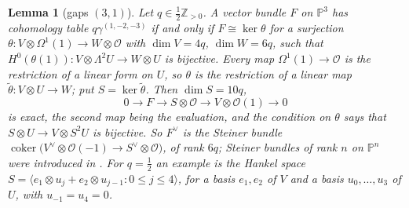 \documentclass[11pt]{amsart}
\newtheorem{lemma}[theorem]{Lemma}
\theoremstyle{definition}
\theoremstyle{remark}
\newcommand{\PP}{\mathbb{P}}
\newcommand{\ZZ}{\mathbb{Z}}
\newcommand{\OO}{\mathcal{O}}
\DeclareMathOperator{\coker}{coker}
\begin{document}
\begin{lemma}[gaps $(3,1)$]\label{lem:beil31}
Let $q\in\frac12\ZZ_{>0}$. A vector bundle $F$ on $\PP^3$ has cohomology table $q\gamma^{(1,-2,-3)}$ if and only if $F\cong\ker\theta$ for a surjection $\theta\colon V\otimes\Omega^1(1)\to W\otimes\OO$ with $\dim V=4q$, $\dim W=6q$, such that $H^0(\theta(1))\colon V\otimes\Lambda^2U\to W\otimes U$ is bijective. Every map $\Omega^1(1)\to\OO$ is the restriction of a linear form on $U$, so $\theta$ is the restriction of a linear map $\tilde\theta\colon V\otimes U\to W$; put $S=\ker\tilde\theta$. Then $\dim S=10q$,
\[
0\longrightarrow F\longrightarrow S\otimes\OO\longrightarrow V\otimes\OO(1)\longrightarrow0
\]
is exact, the second map being the evaluation, and the condition on $\theta$ says that $S\otimes U\to V\otimes S^2U$ is bijective. So $F^\vee$ is the Steiner bundle $\coker\big(V^\vee\otimes\OO(-1)\to S^\vee\otimes\OO\big)$, of rank $6q$; Steiner bundles of rank $n$ on $\PP^n$ were introduced in \cite{DK93}. For $q=\frac12$ an example is the Hankel space $S=\langle e_1\otimes u_{j}+e_2\otimes u_{j-1}:0\le j\le4\rangle$, for a basis $e_1,e_2$ of $V$ and a basis $u_0,\dots,u_3$ of $U$, with $u_{-1}=u_4=0$.
\end{lemma}
\end{document}
